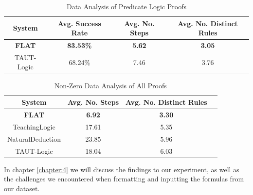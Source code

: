 \documentclass[ms]{uncgdissertationexp2}
\theoremstyle{plain}
\theoremstyle{definition}
\theoremstyle{remark}
\begin{document}
\begin{table}[!ht]
	\centering
	\caption{Data Analysis of Predicate Logic Proofs}
	\begin{tabularx}{\textwidth}{*4c}
		\toprule
		System        & Avg. Success Rate & Avg. No. Steps & Avg. No. Distinct Rules \\    
		\midrule
		\textbf{FLAT} & \textbf{83.53\%}  & \textbf{5.62}  & \textbf{3.05}           \\
		TAUT-Logic    & 68.24\%           & 7.46           & 3.76                    \\
		\bottomrule
	\end{tabularx}
	\label{table:predData}
\end{table}

\begin{table}[!ht]
	\centering
	\caption{Non-Zero Data Analysis of All Proofs}
	\begin{tabularx}{\textwidth}{*4c}
		\toprule
		System           & Avg. No. Steps & Avg. No. Distinct Rules \\    
		\midrule
		\textbf{FLAT}    & \textbf{6.92}  & \textbf{3.30}           \\
		TeachingLogic    & 17.61          & 5.35                    \\
		NaturalDeduction & 23.85          & 5.96                    \\
		TAUT-Logic       & 18.04          & 6.03                    \\
		\bottomrule
	\end{tabularx}
	\label{table:nzAllData}
\end{table}
In chapter \ref{chapter:4} we will discuss the findings to our experiment, as well as the challenges we encountered when formatting and inputting the formulas from our dataset.
\end{document}
